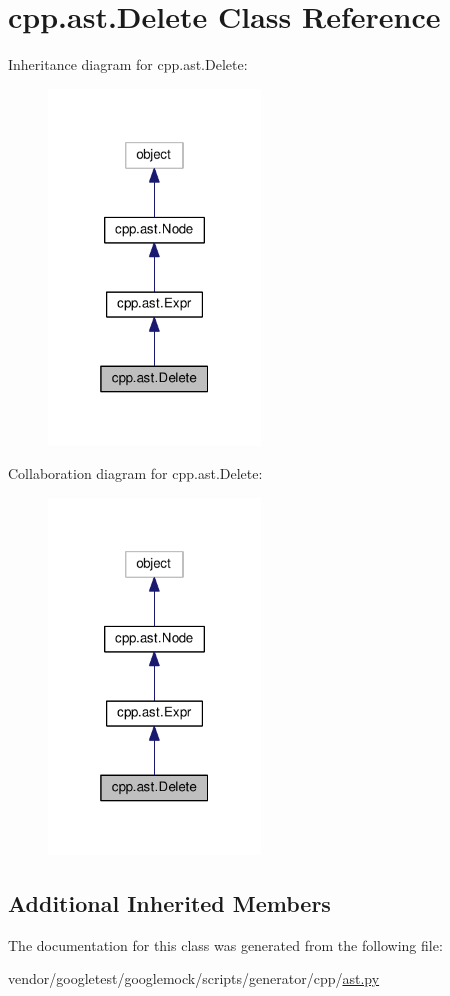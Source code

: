 \hypertarget{classcpp_1_1ast_1_1Delete}{}\section{cpp.\+ast.\+Delete Class Reference}
\label{classcpp_1_1ast_1_1Delete}


Inheritance diagram for cpp.\+ast.\+Delete\+:\nopagebreak
\begin{figure}[H]
\begin{center}
\leavevmode
\includegraphics[width=160pt]{classcpp_1_1ast_1_1Delete__inherit__graph}
\end{center}
\end{figure}


Collaboration diagram for cpp.\+ast.\+Delete\+:\nopagebreak
\begin{figure}[H]
\begin{center}
\leavevmode
\includegraphics[width=160pt]{classcpp_1_1ast_1_1Delete__coll__graph}
\end{center}
\end{figure}
\subsection*{Additional Inherited Members}


The documentation for this class was generated from the following file\+:\begin{DoxyCompactItemize}
\item 
vendor/googletest/googlemock/scripts/generator/cpp/\hyperlink{ast_8py}{ast.\+py}\end{DoxyCompactItemize}
